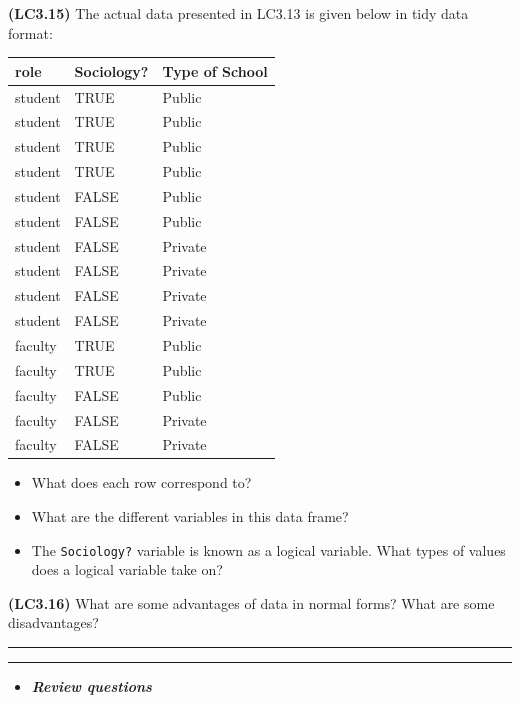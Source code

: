 \documentclass[]{tufte-book}
\let\oldrule=\rule
\renewcommand{\rule}[1]{\oldrule{\linewidth}}
\providecommand{\tightlist}{%
  \setlength{\itemsep}{0pt}\setlength{\parskip}{0pt}}
\newenvironment{rmdblock}[1]
  {\begin{shaded*}
  \begin{itemize}
  \renewcommand{\labelitemi}{
    \raisebox{-.7\height}[0pt][0pt]{
    }
  }
  \item
  }
  {
  \end{itemize}
  \end{shaded*}
  }
\newenvironment{review}
  {\begin{rmdblock}{warning}}
  {\end{rmdblock}}
\begin{document}
\textbf{(LC3.15)} The actual data presented in LC3.13 is given below in
tidy data format:

\begin{tabular}{l|l|l}
\hline
role & Sociology? & Type of School\\
\hline
student & TRUE & Public\\
\hline
student & TRUE & Public\\
\hline
student & TRUE & Public\\
\hline
student & TRUE & Public\\
\hline
student & FALSE & Public\\
\hline
student & FALSE & Public\\
\hline
student & FALSE & Private\\
\hline
student & FALSE & Private\\
\hline
student & FALSE & Private\\
\hline
student & FALSE & Private\\
\hline
faculty & TRUE & Public\\
\hline
faculty & TRUE & Public\\
\hline
faculty & FALSE & Public\\
\hline
faculty & FALSE & Private\\
\hline
faculty & FALSE & Private\\
\hline
\end{tabular}

\begin{itemize}
\tightlist
\item
  What does each row correspond to?\\
\item
  What are the different variables in this data frame?\\
\item
  The \texttt{Sociology?} variable is known as a logical variable. What
  types of values does a logical variable take on?
\end{itemize}

\textbf{(LC3.16)} What are some advantages of data in normal forms? What
are some disadvantages?

\begin{center}\rule{0.5\linewidth}{\linethickness}\end{center}

\begin{center}\rule{0.5\linewidth}{\linethickness}\end{center}

\begin{review}
\textbf{\emph{Review questions}}
\end{review}
\end{document}
